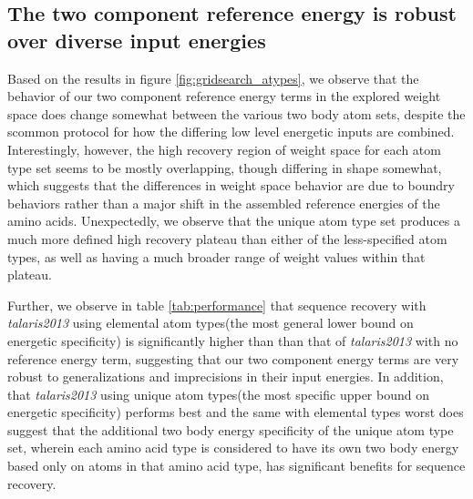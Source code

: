 \subsection{The two component reference energy is robust over diverse input energies}
Based on the results in figure \ref{fig:gridsearch_atypes}, we observe that the behavior of our two component reference energy terms in the explored weight space does change somewhat between the various two body atom sets, despite the scommon protocol for how the differing low level energetic inputs are combined.
Interestingly, however, the high recovery region of weight space for each atom type set seems to be mostly overlapping, though differing in shape somewhat, which suggests that the differences in weight space behavior are due to boundry behaviors rather than a major shift in the assembled reference energies of the amino acids.
Unexpectedly, we observe that the unique atom type set produces a much more defined high recovery plateau than either of the less-specified atom types, as well as having a much broader range of weight values within that plateau.

Further, we observe in table \ref{tab:performance} that sequence recovery with \textit{talaris2013} using elemental atom types(the most general lower bound on energetic specificity) is significantly higher than than that of \textit{talaris2013} with no reference energy term, suggesting that our two component energy terms are very robust to generalizations and imprecisions in their input energies.
In addition, that \textit{talaris2013} using unique atom types(the most specific upper bound on energetic specificity) performs best and the same with elemental types worst does suggest that the additional two body energy specificity of the unique atom type set, wherein each amino acid type is considered to have its own two body energy based only on atoms in that amino acid type, has significant benefits for sequence recovery.

